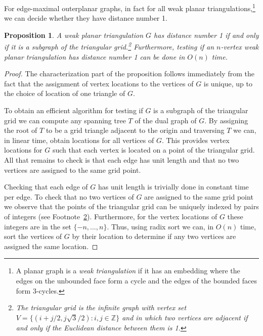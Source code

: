 \documentclass{article}
\newtheorem{prop}{Proposition}
\begin{document}
For edge-maximal outerplanar graphs, in fact for all weak planar
triangulations,\footnote{A planar graph is a \emph{weak triangulation}
if it has an embedding where the edges on the unbounded face form a
cycle and the edges of the bounded faces form 3-cycles.} we can decide
whether they have distance number 1.

\begin{prop} 
A weak planar triangulation $G$ has distance number 1 if and only if
it is a subgraph of the triangular grid.\footnote{The triangular grid
is the infinite graph with vertex set $V=\{(i+j/2,j\sqrt{3}/2):
i,j\in\mathbb{Z}\}$ and in which two vertices are adjacent if and only
if the Euclidean distance between them is 1.\label{fna}}  Furthermore,
testing if an $n$-vertex weak planar triangulation has distance number
1 can be done in $O(n)$ time.  
\end{prop}

\begin{proof}
The characterization part of the proposition follows immediately from
the fact that the assignment of vertex locations to the vertices of
$G$ is unique, up to the choice of location of one triangle of $G$.

To obtain an efficient algorithm for testing if $G$ is a subgraph of
the triangular grid  we can compute any spanning tree $T$ of the dual
graph of $G$. By assigning the root of $T$ to be a grid triangle
adjacent to the origin and traversing $T$ we can, in linear time,
obtain locations for all vertices of $G$.  This provides vertex
locations for $G$ such that each vertex is located on a point of the
triangular grid.  All that remains to check is that each edge has unit
length and that no two vertices are assigned to the same grid point.

Checking that each edge of $G$ has unit length is trivially done in
constant time per edge.  To check that no two vertices of $G$ are
assigned to the same grid point we observe that the points of the
triangular grid can be uniquely indexed by pairs of integers (see
Footnote~\ref{fna}).  Furthermore, for the vertex locations of $G$ these
integers are in the set $\{-n,\ldots,n\}$.  Thus, using radix sort we
can, in $O(n)$ time, sort the vertices of $G$ by their location to
determine if any two vertices are assigned the same location.
\end{proof}
\end{document}
